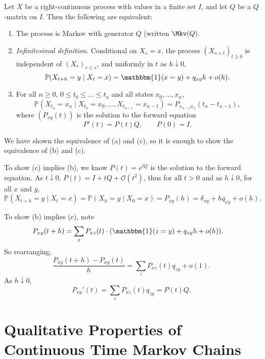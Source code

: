 \documentclass[12pt]{article}
\begin{document}
\begin{theorem}
	Let $X$ be a right-continuous process with values in a finite set $I$, and let $Q$ be a $Q$-matrix on $I$. Then the following are equivalent:
	\begin{enumerate}[\normalfont(a)]
		\item The process is Markov with generator $Q$ (written $\Mkv(Q)$.
		\item \emph{Infinitesimal definition}. Conditional on $X_s = x$, the process $(X_{s+t})_{t \geq 0}$ is independent of $(X_{r})_{r \leq s}$, and uniformly in $t$ as $h \downarrow 0$,
			\[
				\mathbb{P}(X_{t+h} = y \mid X_t = x) = \mathbbm{1}(x = y) + q_{xy}h + o(h)
			.\]
		\item For all $n \geq 0$, $0 \leq t_0 \leq \dots \leq t_n$ and all states $x_0, \dots, x_n$,
			\[
			\mathbb{P}(X_{t_n} = x_n \mid X_{t_0} = x_0, \ldots, X_{t_{n-1}} = x_{n-1}) = P_{x_{n-1}x_{n}}(t_n - t_{n-1})
			,\]
		where $(P_{xy}(t))$ is the solution to the forward equation
		\[
		P'(t) = P(t) Q, \qquad P(0) = I
		.\]
	\end{enumerate}
\end{theorem}

\begin{proofbox}
	We have shown the equivalence of (a) and (c), so it is enough to show the equivalence of (b) and (c).

	To show (c) implies (b), we know $P(t) = e^{tQ}$ is the solution to the forward equation. As $t \downarrow 0$, $P(t) = I + tQ + \mathcal{O}(t^2)$, thus for all $t > 0$ and as $h \downarrow 0$, for all $x$ and $y$,
	\[
	\mathbb{P}(X_{t+h} = y \mid X_t = x) = \mathbb{P}(X_h = y \mid X_0 = x) = P_{xy}(h) = \delta_{xy} + h q_{xy} + o(h)
	.\]

	To show (b) implies (c), note
	\begin{align*}
		P_{xy}(t+h) &= \sum_z P_{xz}(t) \cdot (\mathbbm{1}(z = y) + q_{zy} h + o(h)).
	\end{align*}
	So rearranging,
	\[
	\frac{P_{xy}(t+h) - P_{xy}(t)}{h} = \sum_z P_{xz}(t) q_{zy} + o(1)
	.\]
	As $h \downarrow 0$,
	\[
	P_{xy}'(t) = \sum_{z} P_{xz}(t) q_{zy} = P(t) Q
	.\]
\end{proofbox}

\newpage

\section{Qualitative Properties of Continuous Time Markov Chains}
\label{sec:qualitative_properties_of_continuous_times_markov_chains}
\end{document}
